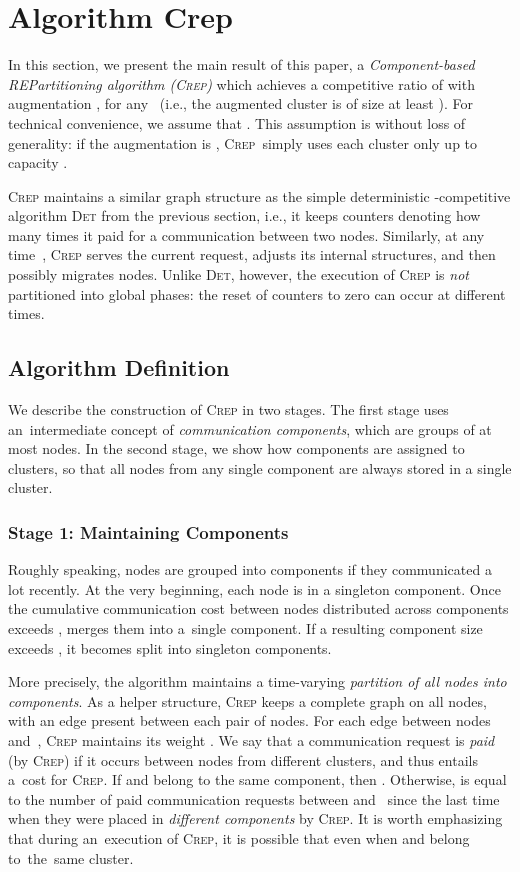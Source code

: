 \documentclass{siamart190516}
\newcommand{\CREP}{\textsc{Crep}\xspace}
\newcommand{\DET}{\textsc{Det}\xspace}
\begin{document}
\section{Algorithm {\sc Crep}}
\label{sec:crep}

In this section, we present the main result of this paper, a
\emph{Component-based REPartitioning algorithm (\CREP)} which achieves a
competitive ratio of  with augmentation
, for any~ (i.e., the augmented cluster
is of size at least ). For technical convenience, we assume that 
. This assumption is without loss of generality: if the augmentation 
is , \CREP~simply uses each cluster only up to capacity .

\CREP maintains a similar graph structure as the
simple deterministic -competitive algorithm \DET from the
previous section, i.e., it keeps counters denoting how many times it paid for a
communication between two nodes. Similarly, at any time~,
\CREP serves the current request, adjusts its internal structures, and then
possibly migrates nodes. Unlike \DET, however, the execution of \CREP is
\emph{not} partitioned into global phases: the reset of counters to zero can
occur at different times.


\subsection{Algorithm Definition}

We describe the construction of \CREP in two stages. The first stage uses
an~intermediate concept of \emph{communication components}, which are groups of at
most  nodes. In the second stage, we show how components are assigned to
clusters, so that all nodes from any single component are always stored in a
single cluster.


\subsubsection{Stage 1: Maintaining Components}

Roughly speaking, nodes are grouped into components if they communicated a lot
recently. At the very beginning, each node is in a singleton component. Once
the cumulative communication cost between nodes distributed across 
components exceeds ,  merges them into a~single
component. If a resulting component size exceeds , it becomes split
into singleton components.

More precisely, the algorithm maintains a time-varying \emph{partition of all
nodes into components}. As a helper structure, \CREP keeps a complete graph on
all  nodes, with an edge present between each pair of nodes. For
each edge between nodes  and~, \CREP maintains its weight . We
say that a communication request is \emph{paid} (by \CREP) if it occurs
between nodes from different clusters, and thus entails a~cost for \CREP. If
 and  belong to the same component, then . Otherwise,
 is equal to the number of paid communication requests between 
and~ since the last time when they were placed in \emph{different components} 
by \CREP. It is worth emphasizing that during an~execution of \CREP, it is
possible that  even when  and  belong to~the~same cluster.
\end{document}
